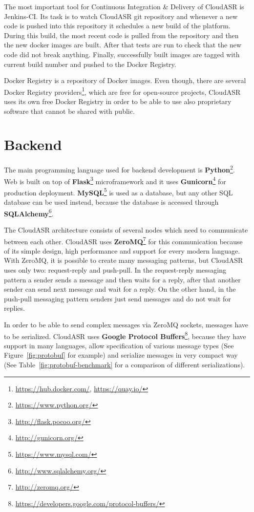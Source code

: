 The most important tool for Continuous Integration \& Delivery of CloudASR is Jenkins-CI.
Its task is to watch CloudASR git repository
  and whenever a new code is pushed into this repository it schedules a new build of the platform.
During this build, the most recent code is pulled from the repository and then the new docker images are built.
After that tests are run to check that the new code did not break anything.
Finally, successfully built images are tagged with current build number and pushed to the Docker Registry.


Docker Registry is a repository of Docker images.
Even though, there are several Docker Registry providers\footnote{\url{https://hub.docker.com/}, \url{https://quay.io/}},
  which are free for open-source projects,
  CloudASR uses its own free Docker Registry in order to be able to use also proprietary software that cannot be shared with public.


\section{Backend}
The main programming language used for backend development is \textbf{Python}\footnote{\url{https://www.python.org/}}.
Web is built on top of \textbf{Flask}\footnote{\url{http://flask.pocoo.org/}} microframework
  and it uses \textbf{Gunicorn}\footnote{\url{http://gunicorn.org/}} for production deployment.
\textbf{MySQL}\footnote{\url{https://www.mysql.com/}} is used as a database,
  but any other SQL database can be used instead,
  because the database is accessed  through \textbf{SQLAlchemy}\footnote{\url{http://www.sqlalchemy.org/}}.

The CloudASR architecture consists of several nodes which need to communicate between each other.
CloudASR uses \textbf{ZeroMQ}\footnote{\url{http://zeromq.org/}} for this communication
  because of its simple design, high performance and support for every modern language.
With ZeroMQ,
  it is possible to create many messaging patterns,
  but CloudASR uses only two: request-reply and push-pull.
In the request-reply messaging pattern a sender sends a message and then waits for a reply,
  after that another sender can send next message and wait for a reply.
On the other hand, in the push-pull messaging pattern senders just send messages and do not wait for replies.


In order to be able to send complex messages via ZeroMQ sockets, messages have to be serialized.
CloudASR uses \textbf{Google Protocol Buffers}\footnote{\url{https://developers.google.com/protocol-buffers/}},
  because they have support in many languages,
  allow specification of various message types (See Figure~\ref{fig:protobuf} for example)
  and serialize messages in very compact way
  (See Table~\ref{fig:protobuf-benchmark} for a comparison of different serializations).

